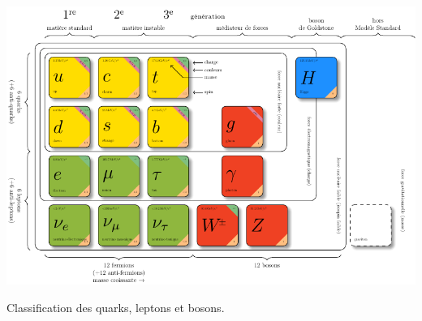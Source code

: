 \begin{minipagewithmarginpars}[h]{\textwidth}
	\vspace{-0.5cm}
	\centering
	\hspace*{-1.5cm}
	\includegraphics[scale=1]{SM/bestiaire.pdf}
	\captionsetup{type=figure}\caption{Classification des quarks, leptons et bosons.}
	\label{bestiaire}
\end{minipagewithmarginpars}
